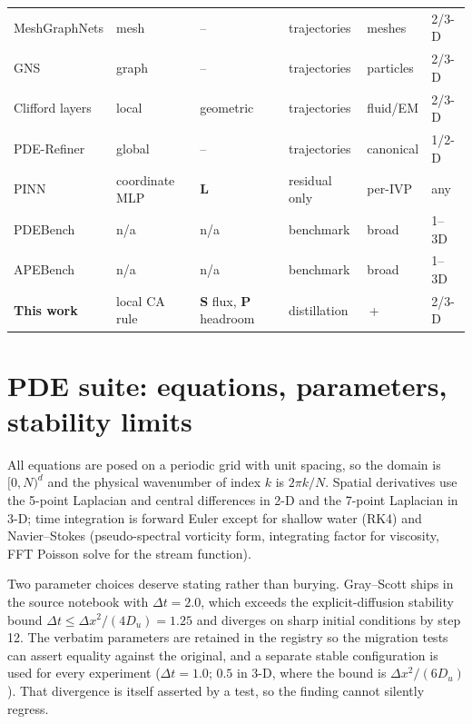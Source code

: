 \begin{table}[h]
\begin{tabular}{llllll}
MeshGraphNets \citep{pfaff2021meshgraphnets} & mesh & -- & trajectories & meshes & 2/3-D \\
GNS \citep{sanchez2020gns} & graph & -- & trajectories & particles & 2/3-D \\
Clifford layers \citep{brandstetter2023clifford} & local & geometric & trajectories & fluid/EM & 2/3-D \\
PDE-Refiner \citep{lippe2023refiner} & global & -- & trajectories & canonical & 1/2-D \\
PINN \citep{raissi2019pinn} & coordinate MLP & \textbf{L} & residual only & per-IVP & any \\
PDEBench \citep{takamoto2022pdebench} & n/a & n/a & benchmark & broad & 1--3D \\
APEBench \citep{koehler2024apebench} & n/a & n/a & benchmark & broad & 1--3D \\
\midrule
\textbf{This work} & local CA rule & \textbf{S} flux, \textbf{P} headroom & distillation
  & \NpdesTwoD{}\,+\,\NpdesThreeD{} & 2/3-D \\
\bottomrule
\end{tabular}
\end{table}

\section{PDE suite: equations, parameters, stability limits}\label{app:suite}

All equations are posed on a periodic grid with unit spacing, so the domain is $[0,N)^d$
and the physical wavenumber of index $k$ is $2\pi k/N$. Spatial derivatives use the
5-point Laplacian and central differences in 2-D and the 7-point Laplacian in 3-D; time
integration is forward Euler except for shallow water (RK4) and Navier--Stokes
(pseudo-spectral vorticity form, integrating factor for viscosity, FFT Poisson solve for
the stream function).

Two parameter choices deserve stating rather than burying. Gray--Scott ships in the source
notebook with $\Delta t = 2.0$, which exceeds the explicit-diffusion stability bound
$\Delta t \le \Delta x^2 / (4 D_u) = 1.25$ and diverges on sharp initial conditions by
step 12. The verbatim parameters are retained in the registry so the migration tests can
assert equality against the original, and a separate stable configuration is used for
every experiment ($\Delta t = 1.0$; $0.5$ in 3-D, where the bound is $\Delta x^2/(6D_u)$).
That divergence is itself asserted by a test, so the finding cannot silently regress.

